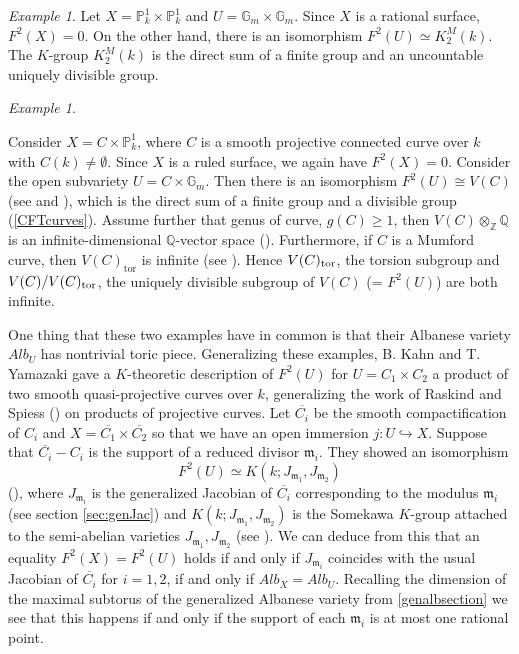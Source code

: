 \documentclass[12pt]{amsart}
\theoremstyle{remark}
\newtheorem{exm}[thm]{Example}
\newcommand{\G}{{\mathbb G}}
\renewcommand{\1}{{\mathbb{S}}}
\newcommand{\<}{\langle}
\renewcommand{\>}{\rangle}
\newcommand{\tor}{{\rm tor}}
\begin{document}
\begin{exm}
    Let $X=\mathbb{P}^1_k\times \mathbb{P}^1_k$ and $U=\G_m\times \G_m$. Since $X$ is a rational surface, $F^2(X)=0$. On the other hand, there is an isomorphism $F^2(U)\simeq K_2^M(k)$. The $K$-group $K_2^M(k)$ is the direct sum of a finite group and an uncountable uniquely divisible group.
     \end{exm}
    
    
    \begin{exm}\label{ruled-surface example}
        
   
    Consider $X=C\times \mathbb{P}^1_k$, where $C$ is a smooth projective connected curve over $k$ with $C(k) \neq \emptyset$. Since $X$ is a ruled surface, we again have $F^2(X)=0$. Consider the open subvariety $U=C\times \G_m$. Then there is an isomorphism $F^2(U)\cong V(C)$ (see \cite[1.7]{KY} and \cite[2.4.4]{RS}), which is the direct sum of a finite group and a divisible group (\autoref{CFTcurves}).
    Assume further that genus of curve, $g(C) \geq 1$, then \( V(C) \otimes_{\mathbb{Z}} \mathbb{Q} \) is an infinite-dimensional \( \mathbb{Q} \)-vector space (\cite[Page~210]{Sz}). Furthermore, if \( C \) is a Mumford curve, then \( V(C)_{\mathrm{tor}} \) is infinite (see \cite[Page 178]{AS}). Hence $V(C)_{\tor}$, the torsion subgroup and $V(C)/V(C)_{\tor}$, the uniquely divisible subgroup of $V(C)$ (= $F^2(U)$) are both infinite. 


\end{exm}  

 One thing that these two examples have in common is that their Albanese variety $Alb_U$ has nontrivial toric piece. Generalizing these examples, B. Kahn and T. Yamazaki \cite{KY}  gave a $K$-theoretic description of $F^2(U)$ for 
$U=C_1\times C_2$ a product of two smooth quasi-projective curves over $k$, generalizing the work of Raskind and Spiess (\cite{RS}) on products of projective curves. Let $\overline{C_i}$ be the smooth compactification of $C_i$ and $X=\overline{C_1}\times\overline{C_2}$ so that we have an open immersion $j:U\hookrightarrow X$. Suppose that $\overline{C_i}-C_i$ is the support of a reduced divisor $\mathfrak{m}_i$. They showed   an isomorphism
 \begin{equation}\label{opencurves}
     F^2(U)\simeq K(k;J_{\mathfrak{m}_1}, J_{\mathfrak{m}_2})
 \end{equation} (\cite[1.7]{KY}), 
    where $J_{\mathfrak{m}_i}$ is the generalized Jacobian of $\overline{C_i}$ corresponding to the modulus $\mathfrak{m}_i$ (see section \ref{sec:genJac}) and $K(k;J_{\mathfrak{m}_1}, J_{\mathfrak{m}_2})$ is the Somekawa $K$-group attached to the semi-abelian varieties $J_{\mathfrak{m}_1}, J_{\mathfrak{m}_2}$ (see \cite{Som}).
    We can deduce from this that an equality $F^2(X)=F^2(U)$ holds if and only if $J_{\mathfrak{m}_i}$ coincides with the usual Jacobian of $\overline{C_i}$ for $i=1,2$, if and only if $Alb_X=Alb_U$. Recalling the dimension of the maximal subtorus of the generalized Albanese variety from \autoref{genalbsection} we see that this happens if and only if the support of each $\mathfrak{m}_i$ is at most one rational point. 
\end{document}
